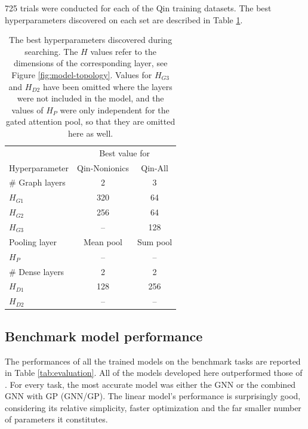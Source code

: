 \num{725} trials were conducted for each of the Qin training datasets. The best
hyperparameters discovered on each set are described in Table \ref{tab:hb-hps}.

\begin{table}
    \centering
    \caption{The best hyperparameters discovered during searching. The $H$
        values refer to the dimensions of the corresponding layer, see Figure
        \ref{fig:model-topology}. Values for $H_{G3}$ and $H_{D2}$ have been
        omitted where the layers were not included in the model, and the values
        of $H_P$ were only independent for the gated attention pool, so that
        they are omitted here as well.}
    \label{tab:hb-hps}
    \begin{tabular}{@{}lcc@{}} \toprule
                        & \multicolumn{2}{c}{Best value for}            \\\cmidrule(l){2-3}
        Hyperparameter  & Qin-Nonionics                      & Qin-All  \\\midrule
        \# Graph layers & 2                                  & 3        \\
        $H_{G1}$        & 320                                & 64       \\
        $H_{G2}$        & 256                                & 64       \\
        $H_{G3}$        & --                                 & 128      \\
        Pooling layer   & Mean pool                          & Sum pool \\
        $H_P$           & --                                 & --       \\
        \# Dense layers & 2                                  & 2        \\
        $H_{D1}$        & 128                                & 256      \\
        $H_{D2}$        & --                                 & --       \\\bottomrule
    \end{tabular}
\end{table}

\subsection{Benchmark model performance}

The performances of all the trained models on the benchmark tasks are reported
in Table \ref{tab:evaluation}. All of the models developed here outperformed
those of \citet{qinPredictingCriticalMicelle2021}. For every task, the most
accurate model was either the GNN or the combined GNN with GP (GNN/GP). The
linear model's performance is surprisingly good, considering its relative
simplicity, faster optimization and the far smaller number of parameters it
constitutes.


